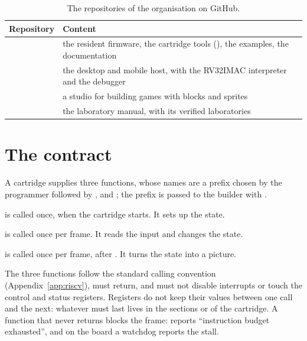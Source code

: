 \begin{table}[htb]
\centering\small
\caption{The repositories of the organisation  on GitHub.}\label{tab:prg:repos}
\begin{tabularx}{\textwidth}{@{}P{0.42\textwidth}L@{}}
\toprule
\textbf{Repository} & \textbf{Content}\\
\midrule
{} & the resident firmware, the cartridge tools (), the examples, the documentation\\
 & the desktop and mobile host, with the RV32IMAC interpreter and the debugger\\
 & a studio for building games with blocks and sprites\\
 & the laboratory manual, with its verified laboratories\\
\bottomrule
\end{tabularx}
\end{table}

\section{The contract}

A cartridge supplies three functions, whose names are a prefix chosen by the
programmer followed by ,  and ; the
prefix is passed to the builder with .

\begin{description}[style=nextline,leftmargin=1.5em]
\item[\code{prefix\_init}] is called once, when the cartridge starts. It sets
  up the state.
\item[\code{prefix\_update}] is called once per frame. It reads the input and
  changes the state.
\item[\code{prefix\_draw}] is called once per frame, after . It
  turns the state into a picture.
\end{description}

The three functions follow the standard \riscv calling convention
(Appendix~\ref{app:riscv}), must return, and must not disable interrupts or
touch the control and status registers. Registers do not keep their values
between one call and the next: whatever must last lives in the sections
 or  of the cartridge. A function that never returns
blocks the frame: \prgqt reports ``instruction budget exhausted'', and on the
board a watchdog reports the stall.

